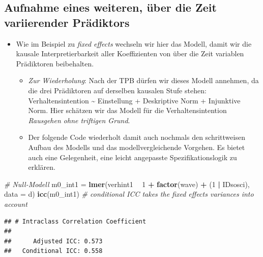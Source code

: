 \documentclass[
]{book}
\newenvironment{Shaded}{\begin{snugshade}}{\end{snugshade}}
\newcommand{\CommentTok}[1]{\textcolor[rgb]{0.56,0.35,0.01}{\textit{#1}}}
\newcommand{\DataTypeTok}[1]{\textcolor[rgb]{0.13,0.29,0.53}{#1}}
\newcommand{\DecValTok}[1]{\textcolor[rgb]{0.00,0.00,0.81}{#1}}
\newcommand{\KeywordTok}[1]{\textcolor[rgb]{0.13,0.29,0.53}{\textbf{#1}}}
\newcommand{\NormalTok}[1]{#1}
\newcommand{\OperatorTok}[1]{\textcolor[rgb]{0.81,0.36,0.00}{\textbf{#1}}}
\newcommand{\StringTok}[1]{\textcolor[rgb]{0.31,0.60,0.02}{#1}}
\providecommand{\tightlist}{%
  \setlength{\itemsep}{0pt}\setlength{\parskip}{0pt}}
\begin{document}
\hypertarget{aufnahme-eines-weiteren-uxfcber-die-zeit-variierender-pruxe4diktors}{%
\subsection*{Aufnahme eines weiteren, über die Zeit variierender Prädiktors}\label{aufnahme-eines-weiteren-uxfcber-die-zeit-variierender-pruxe4diktors}}

\begin{itemize}
\tightlist
\item
  Wie im Beispiel zu \emph{fixed effects} wechseln wir hier das Modell, damit wir die kausale Interpretierbarkeit aller Koeffizienten von über die Zeit variablen Prädiktoren beibehalten.

  \begin{itemize}
  \tightlist
  \item
    \emph{Zur Wiederholung}: Nach der TPB dürfen wir dieses Modell annehmen, da die drei Prädiktoren auf derselben kausalen Stufe stehen: Verhaltensintention \textasciitilde{} Einstellung + Deskriptive Norm + Injunktive Norm. Hier schätzen wir das Modell für die Verhaltensintention \emph{Rausgehen ohne triftigen Grund}.
  \item
    Der folgende Code wiederholt damit auch nochmals den schrittweisen Aufbau des Modells und das modellvergleichende Vorgehen. Es bietet auch eine Gelegenheit, eine leicht angepasste Spezifikationslogik zu erklären.
  \end{itemize}
\end{itemize}

\begin{Shaded}
\begin{Highlighting}[]
\CommentTok{# Null-Modell}
\NormalTok{m0_int1 =}\StringTok{ }\KeywordTok{lmer}\NormalTok{(verhint1 }\OperatorTok{~}\StringTok{ }\DecValTok{1} \OperatorTok{+}\StringTok{ }\KeywordTok{factor}\NormalTok{(wave) }\OperatorTok{+}\StringTok{ }\NormalTok{(}\DecValTok{1} \OperatorTok{|}\StringTok{ }\NormalTok{IDsosci), }\DataTypeTok{data =}\NormalTok{ d)}
\KeywordTok{icc}\NormalTok{(m0_int1)  }\CommentTok{# conditional ICC takes the fixed effects variances into account}
\end{Highlighting}
\end{Shaded}

\begin{verbatim}
## # Intraclass Correlation Coefficient
## 
##      Adjusted ICC: 0.573
##   Conditional ICC: 0.558
\end{verbatim}
\end{document}
